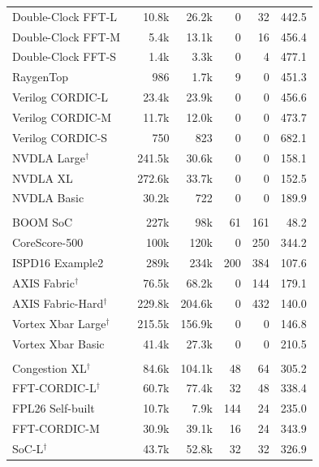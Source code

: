 \documentclass[conference]{IEEEtran}
\begin{document}
\begin{table}[t]
\begin{tabular}{>{\raggedright\arraybackslash}p{2.8cm}rrrrr}
Double-Clock FFT-L~\cite{zipcpu_dblclockfft} & 10.8k & 26.2k & 0 & 32 & 442.5 \\
Double-Clock FFT-M~\cite{zipcpu_dblclockfft} & 5.4k & 13.1k & 0 & 16 & 456.4 \\
Double-Clock FFT-S~\cite{zipcpu_dblclockfft} & 1.4k & 3.3k & 0 & 4 & 477.1 \\
RaygenTop~\cite{vtr_benchmarks} & 986 & 1.7k & 9 & 0 & 451.3 \\
Verilog CORDIC-L~\cite{opencores_cordic} & 23.4k & 23.9k & 0 & 0 & 456.6 \\
Verilog CORDIC-M~\cite{opencores_cordic} & 11.7k & 12.0k & 0 & 0 & 473.7 \\
Verilog CORDIC-S~\cite{opencores_cordic} & 750 & 823 & 0 & 0 & 682.1 \\
NVDLA Large$^\dagger$~\cite{nvidia_nvdla_hw} & 241.5k & 30.6k & 0 & 0 & 158.1 \\
NVDLA XL~\cite{nvidia_nvdla_hw} & 272.6k & 33.7k & 0 & 0 & 152.5 \\
NVDLA Basic~\cite{nvidia_nvdla_hw} & 30.2k & 722 & 0 & 0 & 189.9 \\
\midrule
\multicolumn{6}{@{}l}{\textit{(3) Large system-level designs}}\\
BOOM SoC~\cite{xilinx_fpl26_optimization_contest_2026} & 227k & 98k & 61 & 161 & 48.2 \\
CoreScore-500~\cite{xilinx_fpl26_optimization_contest_2026} & 100k & 120k & 0 & 250 & 344.2 \\
ISPD16 Example2~\cite{xilinx_fpl26_optimization_contest_2026} & 289k & 234k & 200 & 384 & 107.6 \\
AXIS Fabric$^\dagger$~\cite{corundum_repo} & 76.5k & 68.2k & 0 & 144 & 179.1 \\
AXIS Fabric-Hard$^\dagger$~\cite{corundum_repo} & 229.8k & 204.6k & 0 & 432 & 140.0 \\
Vortex Xbar Large$^\dagger$~\cite{vortex_repo} & 215.5k & 156.9k & 0 & 0 & 146.8 \\
Vortex Xbar Basic~\cite{vortex_repo} & 41.4k & 27.3k & 0 & 0 & 210.5 \\
\midrule
\multicolumn{6}{@{}l}{\textit{(4) Generated backend-focused checkpoints}}\\
Congestion XL$^\dagger$ & 84.6k & 104.1k & 48 & 64 & 305.2 \\
FFT-CORDIC-L$^\dagger$ & 60.7k & 77.4k & 32 & 48 & 338.4 \\
FPL26 Self-built & 10.7k & 7.9k & 144 & 24 & 235.0 \\
FFT-CORDIC-M & 30.9k & 39.1k & 16 & 24 & 343.9 \\
SoC-L$^\dagger$ & 43.7k & 52.8k & 32 & 32 & 326.9 \\
\bottomrule
\end{tabular}
\end{table}
\end{document}
